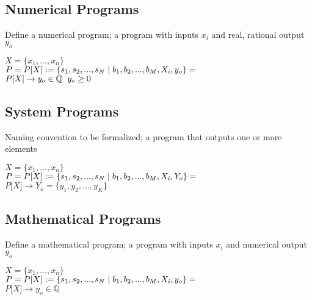 \documentclass[11pt]{article}
\begin{document}
\subsection{Numerical Programs}
Define a numerical program; a program with inputs $x_i$ and real, rational output $y_o$
\begin{center}
$
X = \{x_1,...,x_n\}
$
\\ \vspace{2mm}
$P = P\lbrack X \rbrack := \{ s_1,s_2,...,s_{N}\hspace{1mm}|\hspace{1mm} b_1, b_2,...,b_M,X_i,y_o\}=$
\\ \vspace{2mm}
$
P\lbrack X \rbrack \rightarrow y_o \in \mathbb{Q} \hspace{2mm} y_o \geq 0
$
\end{center}





\subsection{System Programs}
Naming convention to be formalized; a program that outputs one or more elements
\begin{center}
$
X = \{x_1,...,x_n\}
$
\\ \vspace{2mm}
$P = P\lbrack X \rbrack := \{ s_1,s_2,...,s_{N}\hspace{1mm}|\hspace{1mm} b_1, b_2,...,b_M,X_i,Y_o\}=$
\\ \vspace{2mm}
$
P\lbrack X \rbrack \rightarrow Y_o = \{y_1,y_2,...,y_K\}
$
\end{center}





\subsection{Mathematical Programs}
Define a mathematical program; a program with inputs $x_i$ and numerical output $y_o$
\begin{center}
$
X = \{x_1,...,x_n\}
$
\\ \vspace{2mm}
$P = P\lbrack X \rbrack := \{ s_1,s_2,...,s_{N}\hspace{1mm}|\hspace{1mm} b_1, b_2,...,b_M,X_i,y_o\}=$
\\ \vspace{2mm}
$
P\lbrack X \rbrack \rightarrow y_o \in \mathbb{Q}
$
\end{center}
\end{document}
